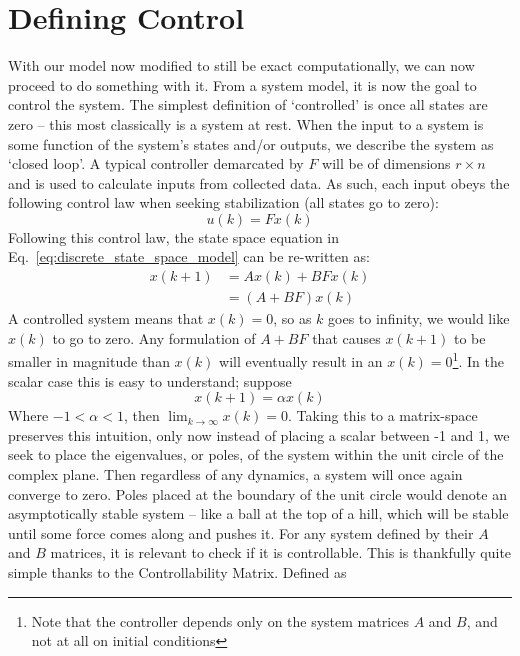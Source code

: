 \FloatBarrier\section{Defining Control} %
With our model now modified to still be exact computationally, we can now proceed to do something with it. From a system model, it is now the goal to control the system. The simplest definition of `controlled' is once all states are zero -- this most classically is a system at rest. When the input to a system is some function of the system's states and/or outputs, we describe the system as `closed loop'. A typical controller demarcated by $F$ will be of dimensions $r\times n$ and is used to calculate inputs from collected data. As such, each input obeys the following control law when seeking stabilization (all states go to zero):
\begin{equation}
    u(k) = Fx(k)
    \label{eq:control_law}
\end{equation}
Following this control law, the state space equation in Eq.~\ref{eq:discrete_state_space_model} can be re-written as:
\begin{align}
    x(k+1)&=Ax(k)+BFx(k) \\
    &=(A+BF)x(k)
    \label{eq:A_BF_state_space}
\end{align}
A controlled system means that $x\left(k\right)=0$, so as $k$ goes to infinity, we would like $x\left(k\right)$ to go to zero. Any formulation of $A+BF$ that causes $x\left(k+1\right)$ to be smaller in magnitude than $x\left(k\right)$ will eventually result in an $x\left(k\right)=0$\footnote{Note that the controller depends only on the system matrices $A$ and $B$, and not at all on initial conditions}. In the scalar case this is easy to understand; suppose
\begin{equation}
    x(k+1)=\alpha x(k)
    \label{eq:scalar_control}
\end{equation}
Where $-1 < \alpha < 1$, then $\lim_{k \to \infty}{x(k) = 0}$. Taking this to a matrix-space preserves this intuition, only now instead of placing a scalar between -1 and 1, we seek to place the eigenvalues, or poles, of the system within the unit circle of the complex plane. Then regardless of any dynamics, a system will once again converge to zero. Poles placed at the boundary of the unit circle would denote an asymptotically stable system -- like a ball at the top of a hill, which will be stable until some force comes along and pushes it.
For any system defined by their $A$ and $B$ matrices, it is relevant to check if it is controllable. This is thankfully quite simple thanks to the Controllability Matrix. Defined as
